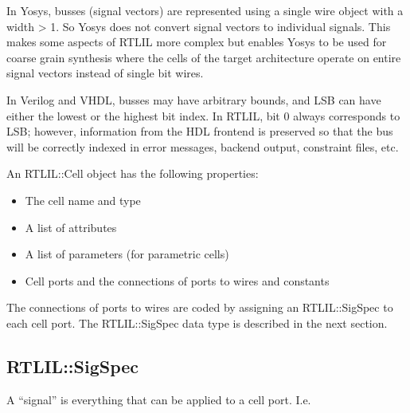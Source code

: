 In Yosys, busses (signal vectors) are represented using a single wire object
with a width > 1. So Yosys does not convert signal vectors to individual signals.
This makes some aspects of RTLIL more complex but enables Yosys to be used for
coarse grain synthesis where the cells of the target architecture operate on
entire signal vectors instead of single bit wires.

In Verilog and VHDL, busses may have arbitrary bounds, and LSB can have either
the lowest or the highest bit index. In RTLIL, bit 0 always corresponds to LSB;
however, information from the HDL frontend is preserved so that the bus will be
correctly indexed in error messages, backend output, constraint files, etc.

An RTLIL::Cell object has the following properties:

\begin{itemize}
\item The cell name and type
\item A list of attributes
\item A list of parameters (for parametric cells)
\item Cell ports and the connections of ports to wires and constants
\end{itemize}

The connections of ports to wires are coded by assigning an RTLIL::SigSpec
to each cell port. The RTLIL::SigSpec data type is described in the next section.

\subsection{RTLIL::SigSpec}

A ``signal'' is everything that can be applied to a cell port. I.e.


